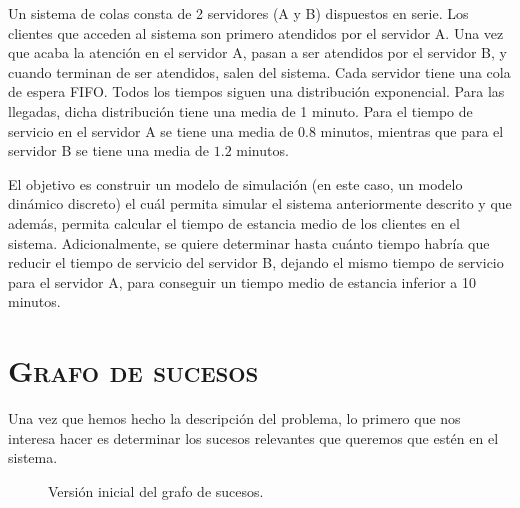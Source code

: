 \documentclass[11pt,a4paper]{article}
\begin{document}
Un sistema de colas consta de 2 servidores (A y B) dispuestos en serie. Los clientes
que acceden al sistema son primero atendidos por el servidor A. Una vez que acaba
la atención en el servidor A, pasan a ser atendidos por el servidor B, y cuando terminan
de ser atendidos, salen del sistema. Cada servidor tiene una cola de espera FIFO. Todos
los tiempos siguen una distribución exponencial. Para las llegadas, dicha distribución tiene
una media de 1 minuto. Para el tiempo de servicio en el servidor A se tiene una media de $0.8$
minutos, mientras que para el servidor B se tiene una media de $1.2$ minutos.

El objetivo es construir un modelo de simulación (en este caso, un modelo dinámico discreto)
el cuál permita simular el sistema anteriormente descrito y que además, permita calcular el tiempo de estancia
medio de los clientes en el sistema. Adicionalmente, se quiere determinar hasta cuánto tiempo
habría que reducir el tiempo de servicio del servidor B, dejando el mismo tiempo de servicio para el servidor
A, para conseguir un tiempo medio de estancia inferior a 10 minutos.

\section{\textsc{Grafo de sucesos}}

Una vez que hemos hecho la descripción del problema, lo primero que nos interesa hacer es determinar
los sucesos relevantes que queremos que estén en el sistema.

\begin{figure}[H]
\centering
{}
\caption{Versión inicial del grafo de sucesos.}
\end{figure}
\end{document}
